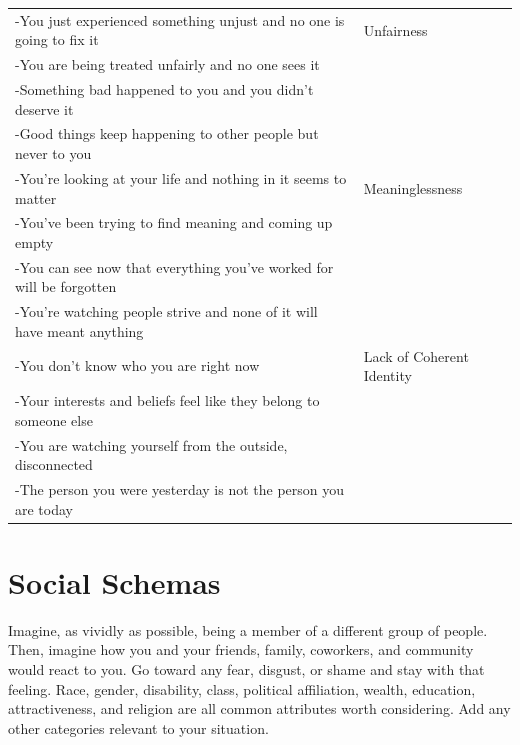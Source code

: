 \documentclass[11pt,oneside]{book}
\begin{document}
\begin{longtable}{>{\raggedright\arraybackslash}p{} >{\raggedright\arraybackslash}p{}}
-You just experienced something unjust and no one is going to fix it & Unfairness \\
-You are being treated unfairly and no one sees it &  \\
-Something bad happened to you and you didn't deserve it &  \\
-Good things keep happening to other people but never to you &  \\
\addlinespace

-You're looking at your life and nothing in it seems to matter & Meaninglessness \\
-You've been trying to find meaning and coming up empty &  \\
-You can see now that everything you've worked for will be forgotten &  \\
-You're watching people strive and none of it will have meant anything &  \\
\addlinespace

-You don't know who you are right now & Lack of Coherent Identity \\
-Your interests and beliefs feel like they belong to someone else &  \\
-You are watching yourself from the outside, disconnected &  \\
-The person you were yesterday is not the person you are today &  \\

\end{longtable}

\section{Social Schemas}
\label{socialPrompts}
Imagine, as vividly as possible, being a member of a different group of people. Then, imagine how you and your friends, family, coworkers, and community would react to you. Go toward any fear, disgust, or shame and stay with that feeling. Race, gender, disability, class, political affiliation, wealth, education, attractiveness, and religion are all common attributes worth considering. Add any other categories relevant to your situation.
\end{document}
